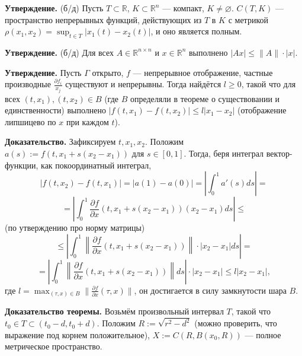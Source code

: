 \QED

\textbf{Утверждение.} (б/д) Пусть $T \subset \mathbb R$, $K \subset \mathbb R^n$ --- компакт, $K \ne \varnothing$. 
$C(T, K)$ --- пространство непрерывных функций, действующих из $T$ в $K$ с метрикой $\rho(x_1, x_2) = \sup_{t \in T} |x_1(t) - x_2(t)|$, и оно является полным.

\textbf{Утверждение.} (б/д) Для всех $A \in \mathbb R^{n \times n}$ и $x \in \mathbb R^n$ выполнено $|Ax| \le \| A \| \cdot |x|$.

\textbf{Утверждение.} Пусть $\Gamma$ открыто, $f$ --- непрерывное отображение, частные производные $\frac{\partial f_i}{x_j}$ существуют и непрерывны.
Тогда найдётся $l \ge 0$, такой что для всех $(t, x_1), (t, x_2) \in B$ (где $B$ определяли в теореме о существовании и единственности) выполнено $|f(t, x_1) - f(t, x_2)| \le l|x_1 - x_2|$ (отображение липшицево по $x$ при каждом $t$).

\textbf{Доказательство.} Зафиксируем $t, x_1, x_2$. Положим $a(s) := f(t, x_1 + s(x_2 - x_1))$ для $s \in [0, 1]$.
Тогда, беря интеграл вектор-функции, как покоординатный интеграл,
\[
    |f(t, x_2) - f(t, x_1)| = |a(1) - a(0)| = \left| \int_{0}^{1} a'(s) ds \right| =
\]
\[
    = \left| \int_{0}^{1} \frac{\partial f}{\partial x} (t, x_1 + s(x_2 - x_1)) (x_2 - x_1) ds \right| \le
\]
(по утверждению про норму матрицы)
\[
    \le \left| \int_{0}^{1} \left\| \frac{\partial f}{\partial x} (t, x_1 + s(x_2 - x_1)) \right\| \cdot |x_2 - x_1| ds \right| =
\]
\[
    = \left| \int_{0}^{1} \left\| \frac{\partial f}{\partial x} (t, x_1 + s(x_2 - x_1)) \right\| ds \right| \cdot |x_2 - x_1| \le
    l |x_2 - x_1|,
\]
где $l = \max_{(\tau, x) \in B} \| \frac{\partial f}{\partial x} (\tau, x) \|$, он достигается в силу замкнутости шара $B$.

\QED

\textbf{Доказательство теоремы.} Возьмём произвольный интервал $T$, такой что $t_0 \in T \subset (t_0 - d, t_0 + d)$.
Положим $R := \sqrt {r^2 - d^2}$ (можно проверить, что выражение под корнем положительное), $X := C(R, B(x_0, R))$ --- полное метрическое пространство.

